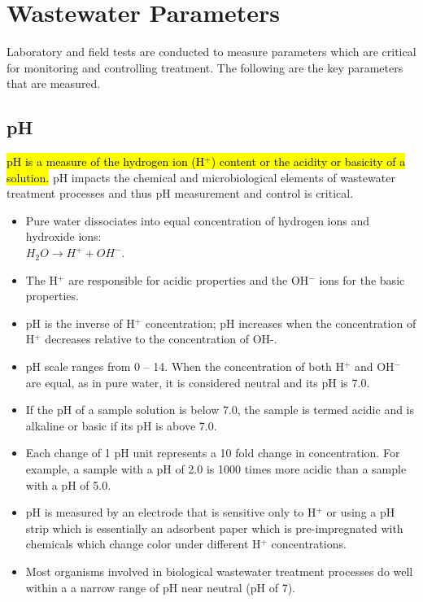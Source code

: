 \section{Wastewater Parameters}			
		Laboratory and field tests are conducted to measure parameters which are critical for monitoring and controlling treatment.  The following are the key parameters that are measured.	
			
\subsection{pH}	
			\hl{pH is a measure of the hydrogen ion (H$^+$) content or the acidity or basicity of a solution.}  pH impacts the chemical and microbiological elements of wastewater treatment processes and thus pH measurement and control is critical.
			\begin{itemize}
				\item Pure water dissociates into equal concentration of hydrogen ions and hydroxide ions:\\ 
				      $H_2O \rightarrow H^+ + OH^-$.
				\item The H$^+$ are responsible for acidic properties and the OH$^-$ ions for the basic properties.  
				\item pH is the inverse of H$^+$ concentration; pH increases when the concentration of H$^+$ decreases relative to the concentration of OH-. 
				\item pH scale ranges from 0 – 14. When the concentration of both H$^+$ and OH$^-$ are equal, as in pure water, it is considered neutral and its pH is 7.0.  \item If the pH of a sample solution is below 7.0, the sample is termed acidic and is alkaline or basic if its pH is above 7.0. 
				\item Each change of 1 pH unit represents a 10 fold change in concentration.  For example, a sample with a pH of 2.0 is 1000 times more acidic than a sample with a pH of 5.0. 
				\item pH is measured by an electrode that is sensitive only to H$^+$ or using a pH strip which is essentially an adsorbent paper which is pre-impregnated with chemicals which change color under different H$^+$ concentrations.
				\item Most organisms involved in biological wastewater treatment processes do well within a a narrow range of pH near neutral (pH of 7).			
			\end{itemize}
			
